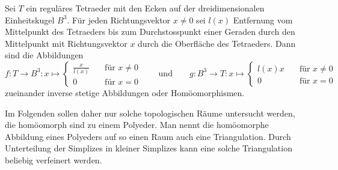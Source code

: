 \begin{beispiel}
Sei $T$ ein reguläres Tetraeder mit den Ecken auf der dreidimensionalen
Einheitskugel $B^3$.
Für jeden Richtungsvektor $x\ne 0$ sei $l(x)$ Entfernung vom Mittelpunkt des
Tetraeders bis zum Durchstosspunkt einer Geraden durch den Mittelpunkt
mit Richtungsvektor $x$ durch die Oberfläche des Tetraeders.
Dann sind die Abbildungen
\[
f\colon
T\to B^3
:
x \mapsto\begin{cases}
\displaystyle
\frac{x}{l(x)}&\quad\text{für $x\ne 0$}\\
0&\quad\text{für $x=0$}
\end{cases}
\qquad\text{und}\qquad
g\colon
B^3\to T
:
x \mapsto\begin{cases}
l(x) x&\quad\text{für $x\ne 0$}\\
0&\quad\text{für $x=0$}
\end{cases}
\]
zueinander inverse stetige Abbildungen oder Homöomorphismen.
\end{beispiel}

Im Folgenden sollen daher nur solche topologischen Räume untersucht werden,
die homöomorph sind zu einem Polyeder.
Man nennt die homöomorphe Abbildung eines Polyeders auf so einen Raum
auch eine Triangulation.
Durch Unterteilung der Simplizes in kleiner Simplizes kann eine solche
Triangulation beliebig verfeinert werden.






